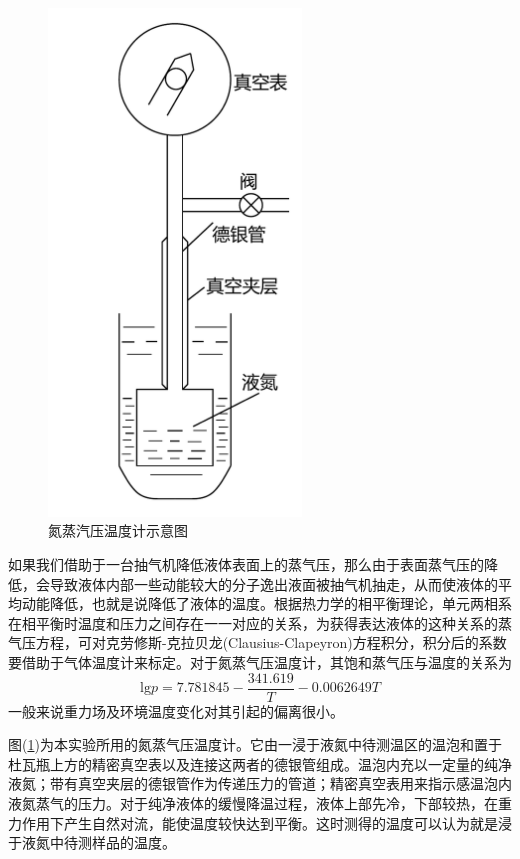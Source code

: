 \documentclass[a4paper]{article}
\begin{document}
\begin{figure}[!h]
\begin{minipage}{0.48\textwidth}
\begin{center}
\includegraphics[width=0.6\textwidth]{fig/fig2.pdf}
\caption{氮蒸汽压温度计示意图}\label{fig2}
\end{center}
\end{minipage}
\end{figure}
如果我们借助于一台抽气机降低液体表面上的蒸气压，那么由于表面蒸气压的降低，会导致液体内部一些动能较大的分子逸出液面被抽气机抽走，从而使液体的平均动能降低，也就是说降低了液体的温度。根据热力学的相平衡理论，单元两相系在相平衡时温度和压力之间存在一一对应的关系，为获得表达液体的这种关系的蒸气压方程，可对克劳修斯-克拉贝龙(Clausius-Clapeyron)方程积分，积分后的系数要借助于气体温度计来标定。对于氮蒸气压温度计，其饱和蒸气压与温度的关系为
\begin{equation}
\text{lg}p = 7.781845 - \frac{341.619}{T} - 0.0062649T\label{eq11}
\end{equation}
一般来说重力场及环境温度变化对其引起的偏离很小。

图(\ref{fig2})为本实验所用的氮蒸气压温度计。它由一浸于液氮中待测温区的温泡和置于杜瓦瓶上方的精密真空表以及连接这两者的德银管组成。温泡内充以一定量的纯净液氮；带有真空夹层的德银管作为传递压力的管道；精密真空表用来指示感温泡内液氮蒸气的压力。对于纯净液体的缓慢降温过程，液体上部先冷，下部较热，在重力作用下产生自然对流，能使温度较快达到平衡。这时测得的温度可以认为就是浸于液氮中待测样品的温度。
\end{document}

